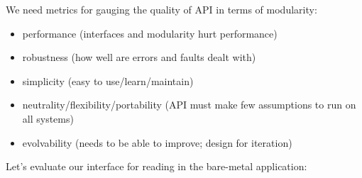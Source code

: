 \documentclass[../../lecture_notes.tex]{subfiles}
\begin{document}
We need metrics for gauging the quality of API in terms of modularity:
\begin{itemize}
\item performance (interfaces and modularity hurt performance)
\item robustness (how well are errors and faults dealt with)
\item simplicity (easy to use/learn/maintain)
\item neutrality/flexibility/portability (API must make few assumptions to run on all systems)
\item evolvability (needs to be able to improve; design for iteration)
\end{itemize}


Let’s evaluate our interface for reading in the bare-metal application: \newline
\begin{center}
\end{center}
\end{document}
